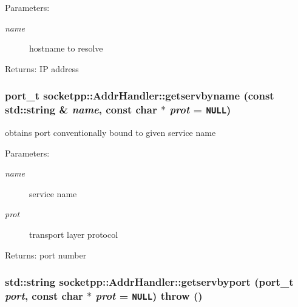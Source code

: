 \begin{Desc}
\item[Parameters:]
\begin{description}
\item[{\em name}]hostname to resolve \end{description}
\end{Desc}
\begin{Desc}
\item[Returns:]IP address \end{Desc}
\hypertarget{classsocketpp_1_1AddrHandler_b4a42f2b0f3842d681ea0cbe6810d6ff}{
\subsubsection[{getservbyname}]{\setlength{\rightskip}{0pt plus 5cm}port\_\-t socketpp::AddrHandler::getservbyname (const std::string \& {\em name}, \/  const char $\ast$ {\em prot} = {\tt NULL})}}
\label{classsocketpp_1_1AddrHandler_b4a42f2b0f3842d681ea0cbe6810d6ff}


obtains port conventionally bound to given service name 

\begin{Desc}
\item[Parameters:]
\begin{description}
\item[{\em name}]service name \item[{\em prot}]transport layer protocol \end{description}
\end{Desc}
\begin{Desc}
\item[Returns:]port number \end{Desc}
\hypertarget{classsocketpp_1_1AddrHandler_f221cac56bf3808494806d335a56bb87}{
\subsubsection[{getservbyport}]{\setlength{\rightskip}{0pt plus 5cm}std::string socketpp::AddrHandler::getservbyport (port\_\-t {\em port}, \/  const char $\ast$ {\em prot} = {\tt NULL})  throw ()}}
\label{classsocketpp_1_1AddrHandler_f221cac56bf3808494806d335a56bb87}



